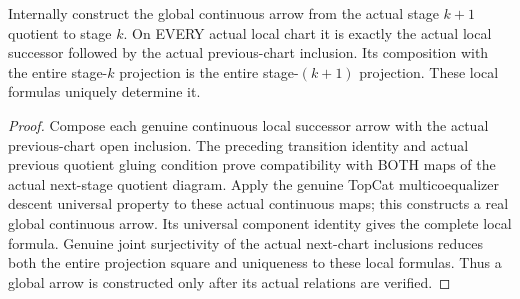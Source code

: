 \begin{theorem}
\label{hir:sharp-actual-curve-global-successor-quotient-map}
\leanok
Internally construct the global continuous arrow from the actual stage
$k+1$ quotient to stage $k$. On EVERY actual local chart it is exactly the
actual local successor followed by the actual previous-chart inclusion.
Its composition with the entire stage-$k$ projection is the entire
stage-$(k+1)$ projection. These local formulas uniquely determine it.
\end{theorem}
\begin{proof}
Compose each genuine continuous local successor arrow with the actual
previous-chart open inclusion. The preceding transition identity and
actual previous quotient gluing condition prove compatibility with BOTH
maps of the actual next-stage quotient diagram. Apply the genuine TopCat
multicoequalizer descent universal property to these actual continuous
maps; this constructs a real global continuous arrow. Its universal
component identity gives the complete local formula. Genuine joint
surjectivity of the actual next-chart inclusions reduces both the entire
projection square and uniqueness to these local formulas. Thus a global
arrow is constructed only after its actual relations are verified.
\end{proof}

